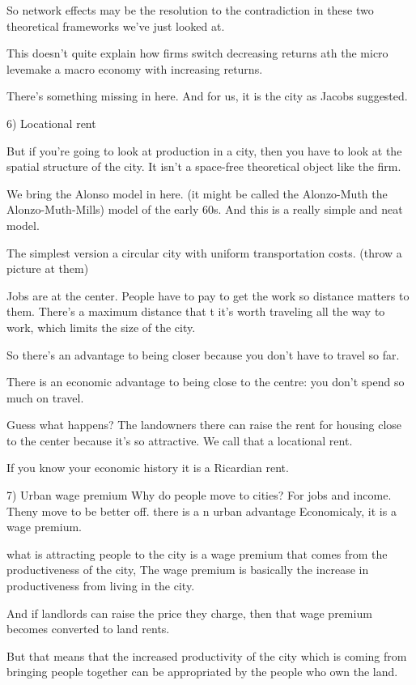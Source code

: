 So network effects may be the resolution to the contradiction in these two theoretical frameworks we've just looked at.

This doesn't quite explain how  firms switch decreasing returns ath the micro levemake a  macro economy with increasing returns. 

There's something missing in here. And for us, it is the city as Jacobs suggested.

6) Locational rent 

But if you're going to look at production in a city, then you have to look at the spatial structure of the city. It isn't a space-free theoretical object like the firm.


We bring the Alonso model in here. (it might be called the Alonzo-Muth the Alonzo-Muth-Mills) model of the early 60s. And this is a really simple and neat model. 

The simplest version a circular city with uniform transportation costs.  (throw a picture at them) 

Jobs are at the center. People have to pay to get the work so distance matters to them.
There's a maximum distance that t it's worth traveling all the way to work, which limits the size of the city.

So there's an advantage to being closer because you don't have to travel so far. 

There is an economic advantage to being close to the centre: you don't spend so much on travel. 

Guess what happens? The landowners there can raise the rent for housing close to the center because it's so attractive. We call that a locational rent.

 If you know your economic history it is a Ricardian rent.

7) Urban wage premium 
Why do people move to cities? For jobs and income. Theny move to be better off. there is a n urban advantage Economicaly, it is a wage premium.

what is attracting people to the city is a wage premium that comes from the productiveness of the city,  
The wage premium is basically the increase in productiveness from living in the city. 

And if landlords can raise the price they charge, then that wage premium becomes converted to land rents.

But that means that the increased productivity of the city which is coming from bringing people together
can be appropriated by the people who own the land.

